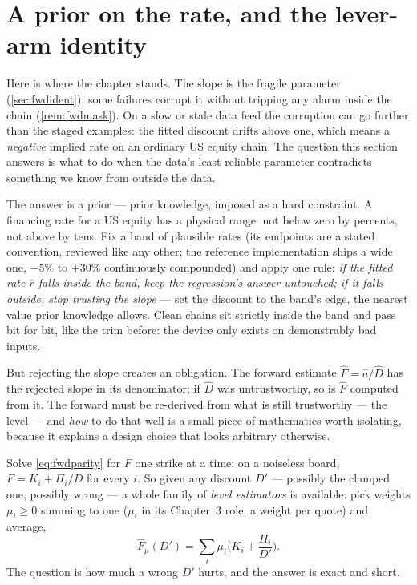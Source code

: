 \section{A prior on the rate, and the lever-arm identity}
\label{sec:fwdclamp}

Here is where the chapter stands.  The slope is the fragile parameter
(\cref{sec:fwdident}); some failures corrupt it without tripping any
alarm inside the chain (\cref{rem:fwdmask}).  On a slow or stale data
feed the corruption can go further than the staged examples: the
fitted discount drifts above one, which means a \emph{negative}
implied rate on an ordinary US equity chain.  The question this section answers is
what to do when the data's least reliable parameter contradicts
something we know from outside the data.

The answer is a prior --- prior knowledge, imposed as a hard
constraint.  A financing rate for a US equity has a physical range:
not below zero by percents, not above by tens.  Fix a band of
plausible rates (its endpoints are a stated convention, reviewed
like any other; the reference implementation ships a wide one,
$-5\%$ to $+30\%$ continuously compounded) and
apply one rule:
\emph{if the fitted rate $\hat r$ falls inside the band, keep the
regression's answer untouched; if it falls outside, stop trusting the
slope} --- set the discount to the band's edge, the nearest value
prior knowledge allows.  Clean chains sit strictly inside the band
and pass bit for bit, like the trim before: the device only exists on
demonstrably bad inputs.

But rejecting the slope creates an obligation.  The forward estimate
$\hat F=\hat a/\hat D$ has the rejected slope in its denominator; if
$\hat D$ was untrustworthy, so is $\hat F$ computed from it.  The
forward must be re-derived from what is still trustworthy --- the
level --- and \emph{how} to do that well is a small piece of
mathematics worth isolating, because it explains a design choice that
looks arbitrary otherwise.

Solve \eqref{eq:fwdparity} for $F$ one strike at a time: on a
noiseless board, $F=K_i+\Pi_i/D$ for every $i$.  So given any
discount $D'$ --- possibly the clamped one, possibly wrong --- a
whole family of \emph{level estimators} is available: pick weights
$\mu_i\ge0$ summing to one ($\mu_i$ in its Chapter~3 role, a weight
per quote) and average,
\[
\hat F_\mu(D')=\sum_i\mu_i\Big(K_i+\frac{\Pi_i}{D'}\Big).
\]
The question is how much a wrong $D'$ hurts, and the answer is exact
and short.

